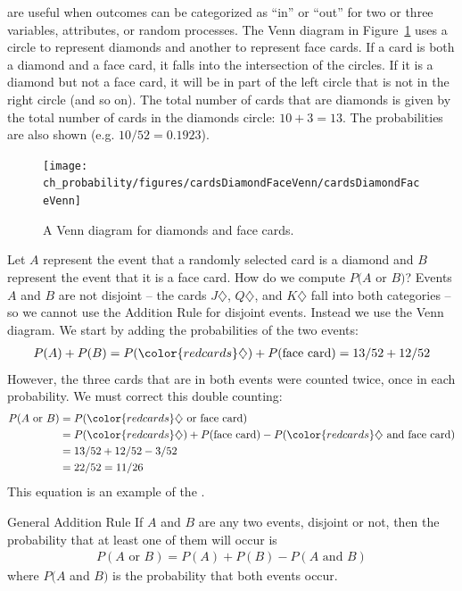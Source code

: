  are useful when outcomes can be categorized as ``in'' or ``out'' for two or three variables, attributes, or random processes. The Venn diagram in Figure~\ref{cardsDiamondFaceVenn} uses a circle to represent diamonds and another to represent face cards. If a card is both a diamond and a face card, it falls into the intersection of the circles. If it is a diamond but not a face card, it will be in part of the left circle that is not in the right circle (and so on). The total number of cards that are diamonds is given by the total number of cards in the diamonds circle: $10+3=13$. The probabilities are also shown (e.g. $10/52 = 0.1923$).

\begin{figure}
\centering
\texttt{[image: ch\_probability/figures/cardsDiamondFaceVenn/cardsDiamondFaceVenn]}
\caption{A Venn diagram for diamonds and face cards.}
\label{cardsDiamondFaceVenn}
\end{figure}

Let $A$ represent the event that a randomly selected card is a diamond and $B$ represent the event that it is a face card. How do we compute $P(A$ or $B)$? Events $A$ and $B$ are not disjoint -- the cards {\color{redcards}$J\diamondsuit$}, {\color{redcards}$Q\diamondsuit$}, and {\color{redcards}$K\diamondsuit$} fall into both categories -- so we cannot use the Addition Rule for disjoint events. Instead we use the Venn diagram. We start by adding the probabilities of the two events:
\begin{align*}
P(A) + P(B)
  = P({\color{redcards}\diamondsuit}) + P(\text{face card})
  = 13/52 + 12/52
\end{align*}
However, the three cards that are in both events were counted twice, once in each probability. We must correct this double counting:
\begin{align*}
P(A\text{ or } B)
  &= P({\color{redcards}\diamondsuit}\text{ or face card}) \\
  &= P({\color{redcards}\diamondsuit}) + P(\text{face card})
      - P({\color{redcards}\diamondsuit}\text{ and face card}) \\
  &= 13/52 + 12/52 - 3/52 \\
  &= 22/52 = 11/26
\end{align*}
This equation is an example of the . 

\begin{onebox}{General Addition Rule}
  If $A$ and $B$ are any two events, disjoint or not, then
  the probability that at least one of them will occur is
  \begin{align*}
  P(A\text{ or }B) = P(A) + P(B) - P(A\text{ and }B)
  \end{align*}
  where $P(A$ and $B)$ is the probability that both events occur.
\end{onebox}

